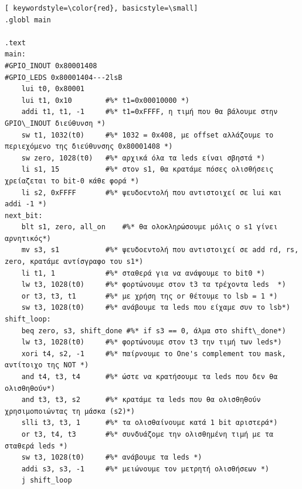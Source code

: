 \documentclass[a4paper]{article}
\begin{document}
\begin{lstlisting}[ keywordstyle=\color{red}, basicstyle=\small]
.globl main

.text
main:
#GPIO_INOUT 0x80001408
#GPIO_LEDS 0x80001404---2lsB
    lui t0, 0x80001
    lui t1, 0x10    	#%* t1=0x00010000 *)
    addi t1, t1, -1 	#%* t1=0xFFFF, η τιμή που θα βάλουμε στην GPIO\_INOUT διεύθυνση *)
    sw t1, 1032(t0) 	#%* 1032 = 0x408, με offset αλλάζουμε το περιεχόμενο της διεύθυνσης 0x80001408 *)
    sw zero, 1028(t0)   #%* αρχικά όλα τα leds είναι σβηστά *)
    li s1, 15       	#%* στον s1, θα κρατάμε πόσες ολισθήσεις χρείαζεται το bit-0 κάθε φορά *)
    li s2, 0xFFFF   	#%* ψευδοεντολή που αντιστοιχεί σε lui και addi -1 *)
next_bit:
    blt s1, zero, all_on	#%* θα ολοκληρώσουμε μόλις ο s1 γίνει αρνητικός*)
    mv s3, s1       	#%* ψευδοεντολή που αντιστοιχεί σε add rd, rs, zero, κρατάμε αντίσγραφο του s1*)
    li t1, 1        	#%* σταθερά για να ανάψουμε το bit0 *)
    lw t3, 1028(t0) 	#%* φορτώνουμε στον t3 τα τρέχοντα leds  *)
    or t3, t3, t1 		#%* με χρήση της or θέτουμε το lsb = 1 *)
    sw t3, 1028(t0) 	#%* ανάβουμε τα leds που είχαμε συν το lsb*)
shift_loop:
    beq zero, s3, shift_done #%* if s3 == 0, άλμα στο shift\_done*)
    lw t3, 1028(t0)     #%* φορτώνουμε στον t3 την τιμή των leds*)
    xori t4, s2, -1     #%* παίρνουμε το One's complement του mask, αντίτοιχο της NOT *)
	and t4, t3, t4      #%* ώστε να κρατήσουμε τα leds που δεν θα ολισθηθούν*)
    and t3, t3, s2      #%* κρατάμε τα leds που θα ολισθηθούν χρησιμοποιώντας τη μάσκα (s2)*)
    slli t3, t3, 1      #%* τα ολισθαίνουμε κατά 1 bit αριστερά*)
    or t3, t4, t3       #%* συνδυάζομε την ολισθημένη τιμή με τα σταθερά leds *)
    sw t3, 1028(t0)     #%* ανάβουμε τα leds *)
    addi s3, s3, -1     #%* μειώνουμε τον μετρητή ολισθήσεων *)
    j shift_loop
    

\end{lstlisting}
\end{document}
